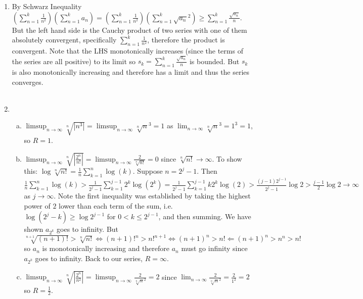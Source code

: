 \documentclass{article}
\begin{document}
\begin{enumerate}
\item By Schwarz Inequality $\left(\displaystyle\sum_{n=1}^{k} \frac{1}{n^2} \right)\left(\displaystyle\sum_{n=1}^{k} a_n \right)=\left(\displaystyle\sum_{n=1}^{k} \frac{1}{n^2} \right)\left(\displaystyle\sum_{n=1}^{k} \sqrt{a_n}^2 \right)\geq \displaystyle\sum_{n=1}^{k} \frac{\sqrt{a_n}}{n}$. But the left hand side is the Cauchy product of two series with one of them absolutely convergent, specifically $\displaystyle\sum_{n=1}^{k} \frac{1}{n^2}$, therefore the product is convergent. Note that the LHS monotonically increases (since the terms of the series are all positive) to its limit so $s_k=\displaystyle\sum_{n=1}^{k} \frac{\sqrt{a_n}}{n}$ is bounded. But $s_k$ is also monotonically increasing and therefore has a limit and thus the series converges.
\\
\\
\setcounter{enumi}{8}
\item
\begin{enumerate}[(a)]
\item $\displaystyle\limsup_{n\rightarrow\infty} \sqrt[n]{|n^3|}=\limsup_{n\rightarrow\infty} \sqrt[n]{n}^3 =1$ as $\displaystyle\lim_{n\rightarrow\infty} \sqrt[n]{n}^3 = 1^3=1$, so $R=1$.
\item $\displaystyle\limsup_{n\rightarrow\infty} \sqrt[n]{\left|\frac{2^n}{n!}\right|}=\limsup_{n\rightarrow\infty} \frac{2}{\sqrt[n]{n!}}=0$ since $\sqrt[n]{n!}\rightarrow \infty$. To show this: $\log \sqrt[n]{n!} = \displaystyle\frac{1}{n}\displaystyle\sum_{k=1}^{n}\log(k)$. Suppose $n=2^j-1$. Then $\displaystyle\frac{1}{n}\displaystyle\sum_{k=1}^{n}\log(k) > \displaystyle\frac{1}{2^j-1}\displaystyle\sum_{k=1}^{j-1}2^{k}\log(2^k) = \displaystyle\frac{1}{2^j-1}\displaystyle\sum_{k=1}^{j-1}k2^{k}\log(2)>\frac{(j-1)2^{j-1}}{2^j-1}\log{2} > \frac{j-1}{2}\log{2} \rightarrow \infty$ as $j\rightarrow \infty$. Note the first inequality was established by taking the highest power of $2$ lower than each term of the sum, i.e.  $\log (2^j-k) \geq \log 2^{j-1}$ for $0<k\leq2^{j-1}$, and then summing. We have shown $a_{2^k}$ goes to infinity. But $\sqrt[n+1]{(n+1)!}>\sqrt[n]{n!}\Leftrightarrow (n+1)!^n > n!^{n+1}\Leftrightarrow (n+1)^n > n! \Leftarrow (n+1)^n>n^n > n!$ so $a_n$ is monotonically increasing and therefore $a_n$ must go infinity since $a_{2^k}$ goes to infinity. Back to our series, $R=\infty$.
\item $\displaystyle\limsup_{n\rightarrow\infty} \sqrt[n]{\left|\frac{2^n}{n^2}\right|}=\displaystyle\limsup_{n\rightarrow\infty} \frac{2}{\sqrt[n]{n}^2}=2$ since $\displaystyle\lim_{n\rightarrow\infty} \frac{2}{\sqrt[n]{n}^2}=\frac{2}{1^2}=2$ so $R=\displaystyle\frac{1}{2}$.

\end{enumerate}
\end{enumerate}
\end{document}
